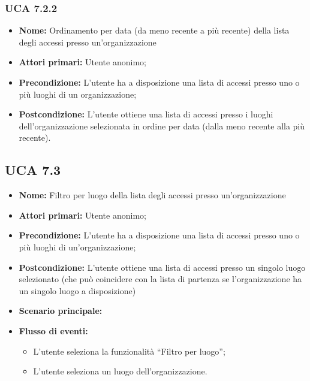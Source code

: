 \subsubsection{UCA 7.2.2}%
\begin{itemize}
	\item \textbf{Nome:} Ordinamento per data (da meno recente a più recente) della lista degli accessi presso un’organizzazione
	\item \textbf{Attori primari:} Utente anonimo;
	\item \textbf{Precondizione:} L’utente ha a disposizione una lista di accessi presso uno o più luoghi di un organizzazione;	
	\item \textbf{Postcondizione:} L’utente ottiene una lista di accessi presso i luoghi dell’organizzazione selezionata in ordine per data (dalla meno recente alla più recente).	
\end{itemize}

\subsection{UCA 7.3}%
\begin{itemize}
	\item \textbf{Nome:} Filtro per luogo della lista degli accessi presso un’organizzazione
	\item \textbf{Attori primari:} Utente anonimo;
	\item \textbf{Precondizione:} L’utente ha a disposizione una lista di accessi presso uno o più luoghi di un'organizzazione;
	\item \textbf{Postcondizione:} L’utente ottiene una lista di accessi presso un singolo luogo selezionato (che può coincidere con la lista di partenza se l’organizzazione ha un singolo luogo a disposizione)	
	\item \textbf{Scenario principale:}
	\item \textbf{Flusso di eventi:} 
	\begin{itemize}
		\item L’utente seleziona la funzionalità “Filtro per luogo”;
		\item L’utente seleziona un luogo dell’organizzazione.
	\end{itemize}
\end{itemize}